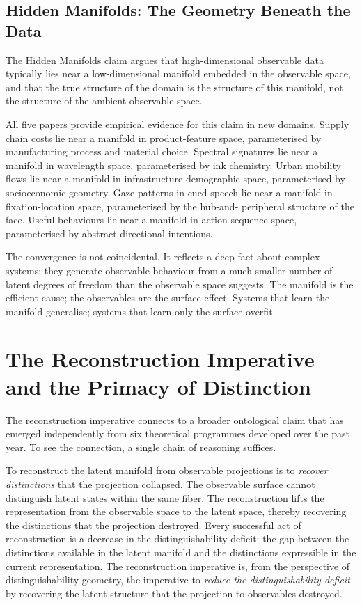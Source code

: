 \documentclass[12pt, letterpaper]{article}
\theoremstyle{remark}
\begin{document}
\subsection{Hidden Manifolds: The Geometry Beneath the Data}

The Hidden Manifolds claim argues that high-dimensional observable data
typically lies near a low-dimensional manifold embedded in the observable
space, and that the true structure of the domain is the structure of this
manifold, not the structure of the ambient observable space.

All five papers provide empirical evidence for this claim in new domains.
Supply chain costs lie near a manifold in product-feature space, parameterised
by manufacturing process and material choice.  Spectral signatures lie near
a manifold in wavelength space, parameterised by ink chemistry.  Urban
mobility flows lie near a manifold in infrastructure-demographic space,
parameterised by socioeconomic geometry.  Gaze patterns in cued speech lie
near a manifold in fixation-location space, parameterised by the hub-and-
peripheral structure of the face.  Useful behaviours lie near a manifold
in action-sequence space, parameterised by abstract directional intentions.

The convergence is not coincidental.  It reflects a deep fact about complex
systems: they generate observable behaviour from a much smaller number of
latent degrees of freedom than the observable space suggests.  The manifold
is the efficient cause; the observables are the surface effect.  Systems
that learn the manifold generalise; systems that learn only the surface
overfit.

\section{The Reconstruction Imperative and the Primacy of Distinction}

The reconstruction imperative connects to a broader ontological claim that
has emerged independently from six theoretical programmes developed over
the past year.  To see the connection, a single chain of reasoning suffices.

To reconstruct the latent manifold from observable projections is to
\emph{recover distinctions} that the projection collapsed.  The observable
surface cannot distinguish latent states within the same fiber.  The
reconstruction lifts the representation from the observable space to the
latent space, thereby recovering the distinctions that the projection
destroyed.  Every successful act of reconstruction is a decrease in
the distinguishability deficit: the gap between the distinctions available
in the latent manifold and the distinctions expressible in the current
representation.  The reconstruction imperative is, from the perspective of
distinguishability geometry, the imperative to \emph{reduce the
distinguishability deficit} by recovering the latent structure that the
projection to observables destroyed.
\end{document}
